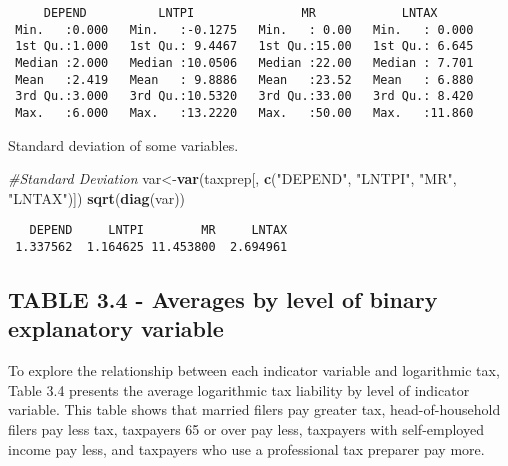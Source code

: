 \documentclass[]{book}
\newenvironment{Shaded}{\begin{snugshade}}{\end{snugshade}}
\newcommand{\CommentTok}[1]{\textcolor[rgb]{0.56,0.35,0.01}{\textit{#1}}}
\newcommand{\KeywordTok}[1]{\textcolor[rgb]{0.13,0.29,0.53}{\textbf{#1}}}
\newcommand{\NormalTok}[1]{#1}
\newcommand{\OperatorTok}[1]{\textcolor[rgb]{0.81,0.36,0.00}{\textbf{#1}}}
\newcommand{\StringTok}[1]{\textcolor[rgb]{0.31,0.60,0.02}{#1}}
\begin{document}
\begin{verbatim}
     DEPEND          LNTPI               MR            LNTAX       
 Min.   :0.000   Min.   :-0.1275   Min.   : 0.00   Min.   : 0.000  
 1st Qu.:1.000   1st Qu.: 9.4467   1st Qu.:15.00   1st Qu.: 6.645  
 Median :2.000   Median :10.0506   Median :22.00   Median : 7.701  
 Mean   :2.419   Mean   : 9.8886   Mean   :23.52   Mean   : 6.880  
 3rd Qu.:3.000   3rd Qu.:10.5320   3rd Qu.:33.00   3rd Qu.: 8.420  
 Max.   :6.000   Max.   :13.2220   Max.   :50.00   Max.   :11.860  
\end{verbatim}

Standard deviation of some variables.

\begin{Shaded}
\begin{Highlighting}[]
\CommentTok{#Standard Deviation}
\NormalTok{var<-}\KeywordTok{var}\NormalTok{(taxprep[, }\KeywordTok{c}\NormalTok{(}\StringTok{"DEPEND"}\NormalTok{, }\StringTok{"LNTPI"}\NormalTok{, }\StringTok{"MR"}\NormalTok{, }\StringTok{"LNTAX"}\NormalTok{)])}
\KeywordTok{sqrt}\NormalTok{(}\KeywordTok{diag}\NormalTok{(var))}
\end{Highlighting}
\end{Shaded}

\begin{verbatim}
   DEPEND     LNTPI        MR     LNTAX 
 1.337562  1.164625 11.453800  2.694961 
\end{verbatim}

\hypertarget{table-3.4---averages-by-level-of-binary-explanatory-variable}{%
\subsection{TABLE 3.4 - Averages by level of binary explanatory variable}\label{table-3.4---averages-by-level-of-binary-explanatory-variable}}

To explore the relationship between each indicator variable and logarithmic tax, Table 3.4 presents the average logarithmic tax liability by level of indicator variable. This table shows that married filers pay greater tax, head-of-household filers pay less tax, taxpayers 65 or over pay less, taxpayers with self-employed income pay less, and taxpayers who use a professional tax preparer pay more.

\begin{Shaded}
\end{Shaded}
\end{document}
